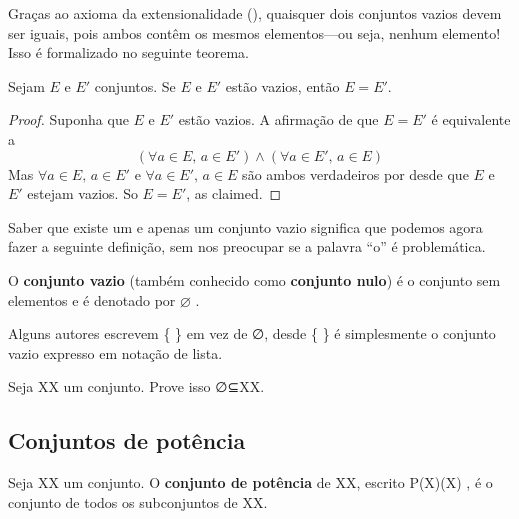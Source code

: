 Graças ao axioma da extensionalidade (), quaisquer dois conjuntos vazios devem ser iguais, pois ambos contêm os mesmos elementos---ou seja, nenhum elemento! Isso é formalizado no seguinte teorema.

\begin{theorem}
\label{thmEmptySetIsUnique}
Sejam $E$ e $E'$ conjuntos. Se $E$ e $E'$ estão vazios, então $E=E'$.
\end{theorem}
\begin{proof}
Suponha que $E$ e $E'$ estão vazios. A afirmação de que $E=E'$ é equivalente a
\[ (\forall a \in E,\, a \in E') \wedge (\forall a \in E',\, a \in E) \]
Mas $\forall a \in E,\, a \in E'$ e $\forall a \in E',\, a \in E$ são ambos verdadeiros por  desde que $E$ e $E'$ estejam vazios. So $E=E'$, as claimed.
\end{proof}

Saber que existe um e apenas um conjunto vazio significa que podemos agora fazer a seguinte definição, sem nos preocupar se a palavra “o” é problemática.

\begin{definition}
\label{defEmptySet}
O \textbf{conjunto vazio} (também conhecido como \textbf{conjunto nulo}) é o conjunto sem elementos e é denotado por $\varnothing$ .
\end{definition}

Alguns autores escrevem {}\{ \} em vez de ∅\varnothing, desde {}\{ \} é simplesmente o conjunto vazio expresso em notação de lista.

\begin{exercise}
\label{exEmptySetSubsetOfEverySet}
Seja XX um conjunto. Prove isso ∅⊆X\varnothing \subseteq X.
\end{exercise}

\subsection*{Conjuntos de potência}

\begin{definition}
\label{defPowerSet}
Seja XX um conjunto. O \textbf{conjunto de potência} de XX, escrito P(X)(X) , é o conjunto de todos os subconjuntos de XX.
\end{definition}

